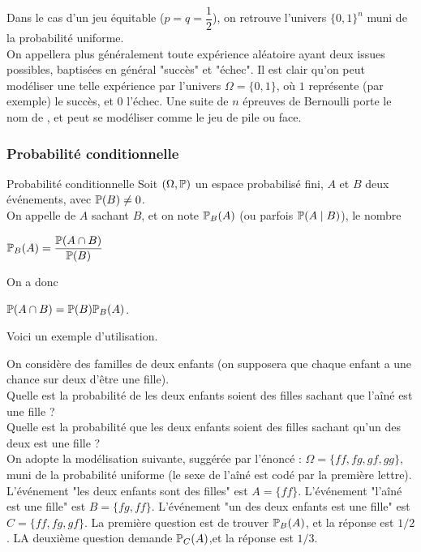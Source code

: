 \documentclass[12pt,a4paper]{report}
\begin{document}
Dans le cas d'un jeu équitable ($p = q = \dfrac{1}{2}$), on retrouve l'univers $\{0,1\}^n$ muni de la probabilité uniforme. \\

On appellera plus généralement  toute expérience aléatoire ayant deux issues possibles, baptisées en général "succès" et "échec". Il est clair qu'on peut modéliser une telle expérience par l'univers $\Omega = \{0,1\}$, où $1$ représente (par exemple) le succès, et $0$ l'échec. Une suite de $n$ épreuves de Bernoulli porte le nom de , et peut se modéliser comme le jeu de pile ou face.

\subsubsection{Probabilité conditionnelle}

\begin{definition}{Probabilité conditionnelle}{}
Soit $(\Omega,\mathbb{P})$ un espace probabilisé fini, $A$ et $B$ deux événements, avec $\mathbb{P}(B) \ne 0$. \\
On appelle  de $A$ sachant $B$, et on note $\mathbb{P}_B(A)$ (ou parfois $\mathbb{P}(A \mid B)$), le nombre 
\begin{center}
$\mathbb{P}_B(A) = \dfrac{\mathbb{P}(A \cap B)}{\mathbb{P}(B)}$
\end{center}
\end{definition}

On a donc
\begin{center}
$\mathbb{P}(A \cap B) = \mathbb{P}(B) \mathbb{P}_B(A)$.
\end{center}

Voici un exemple d'utilisation. 

\begin{exemple}{}
On considère des familles de deux enfants (on supposera que chaque enfant a une chance sur deux d'être une fille). \\
Quelle est la probabilité de les deux enfants soient des filles sachant que l'aîné est une fille ? \\
Quelle est la probabilité que les deux enfants soient des filles sachant qu'un des deux est une fille ? \\

On adopte la modélisation suivante, suggérée par l'énoncé : $\Omega = \{ff,fg,gf,gg\}$, muni de la probabilité uniforme (le sexe de l'aîné est codé par la première lettre). \\
L'événement "les deux enfants sont des filles" est $A = \{ff\}$. L'événement "l'aîné est une fille" est $B = \{fg,ff\}$. L'événement "un des deux enfants est une fille" est $C = \{ff,fg,gf\}$. La première question est de trouver $\mathbb{P}_B(A)$, et la réponse est $1/2$. LA deuxième question demande $\mathbb{P}_C(A)$,et la réponse est $1/3$.
\end{exemple}
\end{document}
